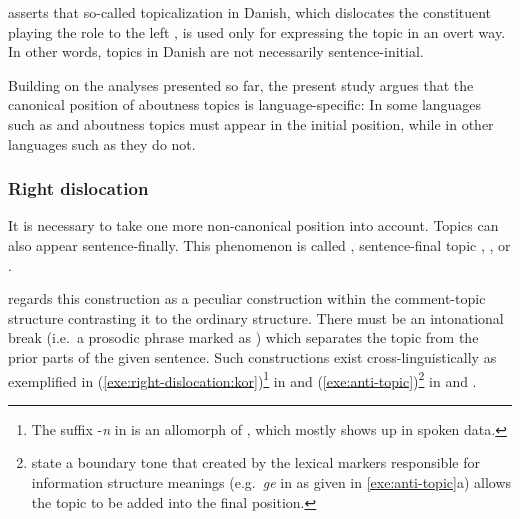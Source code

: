 \noindent \citeauthor{erteschik:07} asserts that so-called
topicalization in Danish, which dislocates the constituent playing the
 role to the left , is used only for
expressing the topic in an overt way.  In other words, topics in
Danish are not necessarily sentence-initial.




Building on the analyses presented so far, the present study argues
that the canonical position of aboutness topics is language-specific:
In some languages such as  and  aboutness topics must
appear in the initial position, while in other languages such as
 they do not.






























\subsubsection{Right dislocation}
\label{4:sssec:right-dislocation}

It is necessary to take one more non-canonical  position into
account. Topics can also appear sentence-finally. This phenomenon is
called  \citep{cecchetto:99,law:03}, sentence-final
topic \citep{fery:krifka:08}, 
\citep{chafe:76,lambrecht:96}, or  \citep{kim:11}.


  


\noindent \citet{gundel:88} regards this construction as a peculiar
construction within the comment-topic structure contrasting it to the
ordinary  structure.  There must be an intonational break
(i.e.\ a prosodic phrase marked as ) which separates the
topic from the prior parts of the given sentence. Such constructions
exist cross-linguistically as exemplified in
(\ref{exe:right-dislocation:kor})\footnote{The suffix -\textit{n} in
   is an allomorph of \nun, which
  mostly shows up in spoken data.} in  and
(\ref{exe:anti-topic})\footnote{\citet{fery:krifka:08} state a
  boundary tone that created by the lexical markers responsible for
  information structure meanings (e.g.\ \textit{ge} in 
  as given in \ref{exe:anti-topic}a) allows the topic to be added
  into the final position.} in  and
.


